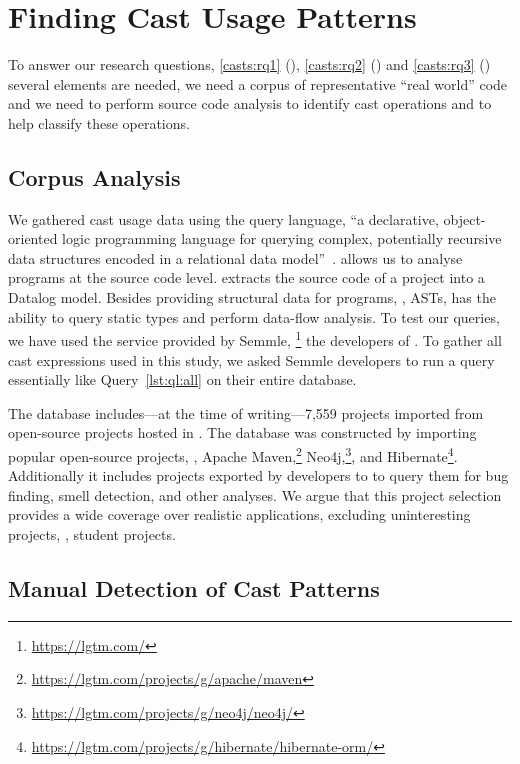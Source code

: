 \section{Finding Cast Usage Patterns}\label{sec:casts:methodology}

To answer our research questions,
\ref{casts:rq1} (\emph{\crqA}),
\ref{casts:rq2} (\emph{\crqB}) and
\ref{casts:rq3} (\emph{\crqC})
several elements are needed,
we need a corpus of representative ``real world'' code and we need to perform
source code analysis to identify cast operations and to help classify these
operations.


\subsection*{Corpus Analysis}

We gathered cast usage data using the \ql{} query language,
``a declarative, object-oriented logic programming language for querying
complex, potentially recursive data structures encoded in a relational data
model''~\citep{avgustinovQLObjectorientedQueries2016}.
\ql{} allows us to analyse programs at the source code level.
\ql{} extracts the source code of a project into a Datalog model.
Besides providing structural data for programs, \ie{}, ASTs,
\ql{} has the ability to query static types and perform data-flow analysis.
To test our \ql{} queries,
we have used the \lgtm{} service provided by Semmle,%
\footnote{\url{https://lgtm.com/}}
the developers of \ql{}.
To gather all cast expressions used in this study,
we asked Semmle developers to run a query essentially like Query~\ref{lst:ql:all} on their entire database.

The \lgtm{} database includes---at the time of writing---7,559 \java{} projects imported from
open-source projects hosted in \github{}.
The \lgtm{} database was constructed by importing popular open-source projects, \eg{},
Apache Maven,\footnote{\url{https://lgtm.com/projects/g/apache/maven}}
Neo4j,\footnote{\url{https://lgtm.com/projects/g/neo4j/neo4j/}}, and
Hibernate\footnote{\url{https://lgtm.com/projects/g/hibernate/hibernate-orm/}}.
Additionally it includes projects exported by developers
to \lgtm{} to query them for bug finding, smell detection, and
other analyses.
We argue that this project selection provides a wide coverage over realistic
\java{} applications, excluding
uninteresting projects, \eg{}, student projects.


\subsection*{Manual Detection of Cast Patterns}

